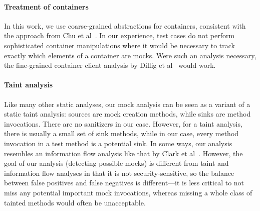 \paragraph{Treatment of containers} In this work, we use coarse-grained abstractions for containers, consistent with the approach from Chu et al~\cite{chu12:_collec_disjoin_analy}. In our experience, test cases do not perform sophisticated container manipulations where it would be necessary to track exactly which elements of a container are mocks. Were such an analysis necessary, the fine-grained container client analysis by Dillig et al~\cite{dillig11:_precis_reason_progr_using_contain} would work.

\paragraph{Taint analysis} Like many other static analyses, our mock analysis can be seen as a variant of a static taint analysis: sources are mock creation methods, while sinks are method invocations. There are no sanitizers in our case. However, for a taint analysis, there is usually a small set of sink methods, while in our case, every method invocation in a test method is a potential sink. In some ways, our analysis resembles an information flow analysis like that by Clark et al~\cite{clark07:_static_analy_quant_infor_flow}. However, the goal of our analysis (detecting possible mocks) is different from taint and information flow analyses in that it is not security-sensitive, so the balance between false positives and false negatives is different---it is less critical to not miss any potential important mock invocations, whereas missing a whole class of tainted methods would often be unacceptable.



